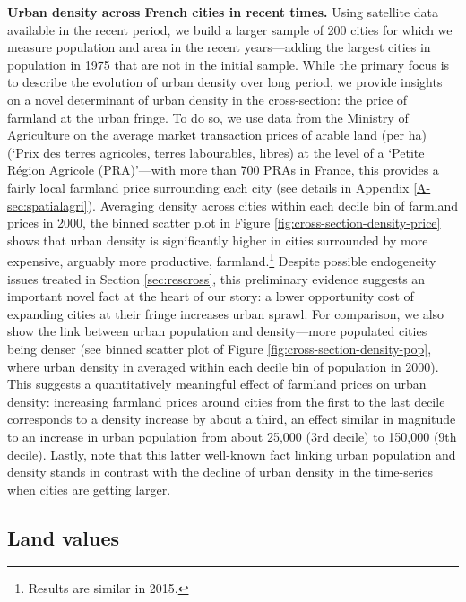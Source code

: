 \documentclass[./20250130-paper.tex]{subfiles}
\begin{document}
\textbf{Urban density across French cities in recent times.} Using satellite data available in the recent period, we build a larger sample of 200 cities for which we measure population and area in the recent years---adding the largest cities in population in 1975 that are not in the initial sample. While the primary focus is to describe the evolution of urban density over long period, we provide insights on a novel determinant of urban density in the cross-section: the price of farmland at the urban fringe. To do so, we use data from the Ministry of Agriculture on the average market transaction prices of arable land (per ha) (`Prix des terres agricoles, terres labourables, libres) at the level of a `Petite Région Agricole (PRA)'---with more than 700 PRAs in France, this provides a fairly local farmland price surrounding each city (see details in Appendix \ref{A-sec:spatialagri}). Averaging density across cities within each decile bin of farmland prices in 2000, the binned scatter plot in Figure \ref{fig:cross-section-density-price} shows that urban density is significantly higher in cities surrounded by more expensive, arguably more productive, farmland.\footnote{Results are similar in 2015.} Despite possible endogeneity issues treated in Section \ref{sec:rescross}, this preliminary evidence suggests an important novel fact at the heart of our story: a lower opportunity cost of expanding cities at their fringe increases urban sprawl. For comparison, we also show the link between urban population and density---more populated cities being denser (see binned scatter plot of Figure \ref{fig:cross-section-density-pop}, where urban density in averaged within each decile bin of population in 2000). This suggests a quantitatively meaningful effect of farmland prices on urban density: increasing farmland prices around cities from the first to the last decile corresponds to a density increase by about a third, an effect similar in magnitude to an increase in urban population from  about 25,000 (3rd decile) to 150,000 (9th decile). Lastly, note that this latter well-known fact linking urban population and density stands in contrast with the decline of urban density in the time-series when cities are getting larger. 



\subsection{Land values}

\end{document}
